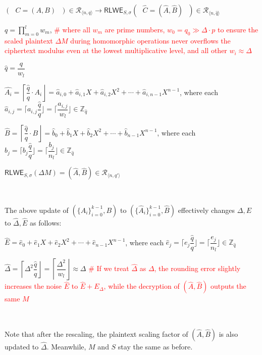 $(\text{ }C = (A, B)\text{ }) \in \mathcal{R}_{\langle n, q \rangle} \rightarrow \textsf{RLWE}_{S, \sigma}(\text{ }\hat{C} = (\hat{A}, \hat{B})\text{ }) \in \mathcal{R}_{\langle n, \hat q \rangle}$ 


$q = \prod\limits_{m=0}^{l}w_m$, \textcolor{red}{ \text{ } \# where all $w_m$ are prime numbers,  $w_0 = q_0 \gg \Delta\cdot p$ to ensure the scaled plaintext $\Delta M$ during homomorphic operations never overflows the ciphertext modulus even at the lowest multiplicative level, and all other $w_i \approx \Delta$}

$\hat{q} = \dfrac{q}{w_l}$

$\hat{A_i} = \left\lceil\dfrac{\hat q}{q}\cdot A_i\right\rfloor = \hat{a}_{i,0} + \hat{a}_{i,1}X + \hat{a}_{i,2}X^2 + \cdots + \hat{a}_{i, {n-1}}X^{n-1}$, where each $\hat{a}_{i,j} = \Big\lceil a_{i,j}\dfrac{\hat{q}}{q} \Big\rfloor = \Big\lceil \dfrac{a_{i,j}}{w_l} \Big\rfloor \in \mathbb{Z}_{\hat{q}}$ 


$\hat{B} = \left\lceil\dfrac{\hat q}{q}\cdot B\right\rfloor = \hat{b}_0 + \hat{b}_1X + \hat{b}_2X^2 + \cdots + \hat{b}_{n-1}X^{n-1}$, where each $\hat{b}_j = \Big\lceil b_j\dfrac{\hat{q}}{q} \Big\rfloor = \Big\lceil \dfrac{b_j}{n_l} \Big\rfloor \in \mathbb{Z}_{\hat{q}}$


$\textsf{RLWE}_{{S},\sigma}(\Delta  M) = (\hat{A}, \hat{B}) \in \mathcal{R}_{\langle n, q' \rangle}$ 


$ $

The above update of $(\{A_i\}_{i=0}^{k-1}, B)$ to $(\{\hat{A}_i\}_{i=0}^{k-1}, \hat B)$ effectively changes $\Delta, E$ to $\hat\Delta, \hat E$ as follows:

$\hat{E} = \hat{e}_0 + \hat{e}_1X + \hat{e}_2X^2 + \cdots + \hat{e}_{n-1}X^{n-1}$, where each $\hat{e}_j = \Big\lceil e_j\dfrac{\hat{q}}{q} \Big\rfloor = \Big\lceil \dfrac{e_j}{n_l} \Big\rfloor \in \mathbb{Z}_{\hat{q}}$

$\hat{\Delta} = \left\lceil\Delta^2\dfrac{\hat{q}}{q}\right\rfloor = \left\lceil\dfrac{\Delta^2}{w_l}\right\rfloor \approx \Delta$ \textcolor{red}{ \# If we treat $\hat\Delta$ as $\Delta$, the rounding error slightly increases the noise $\hat E$ to $\hat E + E_\Delta$, while the decryption of $(\hat A, \hat B)$ outputs the same $M$}

$ $

Note that after the rescaling, the plaintext scaling factor of $(\hat A, \hat B)$ is also updated to $\hat{\Delta}$. Meanwhile, $M$ and $S$ stay the same as before.

